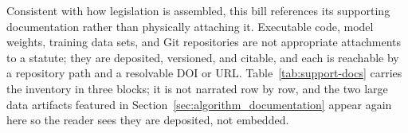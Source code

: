 
Consistent with how legislation is assembled, this bill references its supporting
documentation rather than physically attaching it. Executable code, model
weights, training data sets, and Git repositories are not appropriate attachments
to a statute; they are deposited, versioned, and citable, and each is reachable by
a repository path and a resolvable DOI or URL. Table~\ref{tab:support-docs}
carries the inventory in three blocks; it is not narrated row by row, and the two
large data artifacts featured in Section~\ref{sec:algorithm_documentation} appear
again here so the reader sees they are deposited, not embedded.

